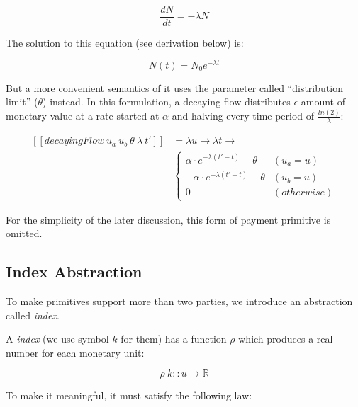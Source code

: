 \begin{equation}
    {\displaystyle {\frac {dN}{dt}}=-\lambda N}
\end{equation}

The solution to this equation (see derivation below) is:

\begin{equation}
    {\displaystyle N(t)=N_{0}e^{-\lambda t}}
\end{equation}

But a more convenient semantics of it uses the parameter called ``distribution limit'' ($\theta$)
instead. In this formulation, a decaying flow distributes $\epsilon$ amount of monetary value at a
rate started at $\alpha$ and halving every time period of $\displaystyle \frac{ln(2)}{\lambda}$:

\begin{equation}
    \begin{split}
        [\![decayingFlow\ u_a\ u_b\ \theta\ \lambda\ t']\!] &=
        \lambda u \rightarrow \lambda t \rightarrow \\
        &\begin{cases}
             {\displaystyle  \alpha \cdot e^{-\lambda (t' - t)} - \theta} & (u_a = u) \\
             {\displaystyle -\alpha \cdot e^{-\lambda (t' - t)} + \theta} & (u_b = u) \\
             0 & (otherwise)
        \end{cases}
    \end{split}
\end{equation}

For the simplicity of the later discussion, this form of payment primitive is omitted.

\subsection{Index Abstraction}

To make primitives support more than two parties, we introduce an abstraction called \textit{index}.

A \textit{index} (we use symbol $k$ for them) has a function $\rho$ which produces a real number for
each monetary unit:

\begin{equation}
    \rho\ k :: u \rightarrow \mathbb{R}
\end{equation}

To make it meaningful, it must satisfy the following law:

